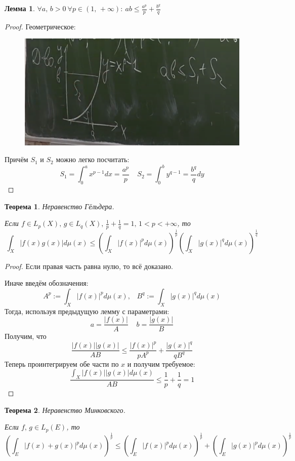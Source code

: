 \documentclass[a4paper,12pt]{article}
\renewcommand{\leq}{\ensuremath{\leqslant}}
\theoremstyle{plain}
\newtheorem{theorem}{Теорема}[section]
\newtheorem{lemma}{Лемма}[section]
\theoremstyle{definition}
\theoremstyle{remark}
\begin{document}
\begin{lemma}
	$\forall a,\,b > 0 \: \forall p \in (1,\,+\infty):\: ab \leq \frac{a^p}{p} + \frac{b^q}{q}$
\end{lemma}
\begin{proof}
	Геометрическое:

	\begin{figure}[h]
		\includegraphics[scale=0.5]{img/yung.png}
	\end{figure}

	Причём $S_1$ и $S_2$ можно легко посчитать:
	\[S_1 = \int_0^a x^{p - 1}dx = \frac{a^p}{p}\;\;\;\; S_2 = \int_0^b y^{q - 1} = \frac{b^q}{q}dy\]
\end{proof}

\begin{theorem}
	Неравенство Гёльдера.

	Если $f \in L_p(X),\, g \in L_q(X),\, \frac{1}{p} + \frac{1}{q} = 1,\, 1 < p < +\infty$, то
	\[\int_X |f(x)g(x)|d\mu(x) \leq \left(\int_X |f(x)|^pd\mu(x)\right)^{\frac{1}{p}}\left(\int_X |g(x)|^qd\mu(x)\right)^{\frac{1}{q}}\]
\end{theorem}

\begin{proof}
	Если правая часть равна нулю, то всё доказано.

	Иначе введём обозначения:
	\[A^p := \int_X|f(x)|^pd\mu(x),\;\;\; B^q := \int_X|g(x)|^qd\mu(x)\]
	Тогда, используя предыдущую лемму с параметрами:
	\[a = \frac{|f(x)|}{A}\;\;\;\; b = \frac{|g(x)|}{B}\]
	Получим, что
	\[\frac{|f(x)||g(x)|}{AB} \leq \frac{|f(x)|^p}{pA^p} + \frac{|g(x)|^q}{qB^q}\]
	Теперь проинтегрируем обе части по $x$ и получим требуемое:
	\[\frac{\int_X |f(x)||g(x)|d\mu(x)}{AB} \leq \frac{1}{p} + \frac{1}{q} = 1\]
\end{proof}

\begin{theorem}
	Неравенство Минковского.

	Если $f,\, g \in L_p(E)$, то
	\[\left(\int_E |f(x) + g(x)|^p d\mu(x)\right)^{\frac{1}{p}} \leq \left(\int_E |f(x)|^p d\mu(x)\right)^{\frac{1}{p}} + \left(\int_E |g(x)|^p d\mu(x)\right)^{\frac{1}{p}}\]
\end{theorem}
\end{document}
